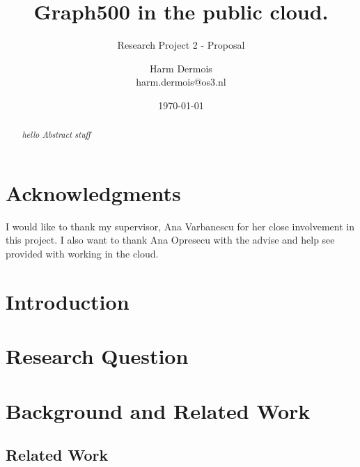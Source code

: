 \documentclass[A4]{scrartcl}
\begin{document}
\title{Graph500 in the public cloud.}
\subtitle{Research Project 2 - Proposal}
\date{\today}
\author{Harm Dermois \\ harm.dermois@os3.nl}

\maketitle
\newpage


\begin{abstract}
\textit{hello Abstract stuff}
\end{abstract}

\newpage

\section*{Acknowledgments}
I would like to thank my supervisor, Ana Varbanescu for her close involvement in this project. I also want to thank Ana Opresecu with the advise and help see provided with working in the cloud.

\tableofcontents
\newpage




\section{Introduction}
\label{sec:introduction}



\section{Research Question}
\label{research-questions}


%

\section{Background and Related Work}
\label{background}


\subsection{Related Work}
\label{related-work}

\end{document}
